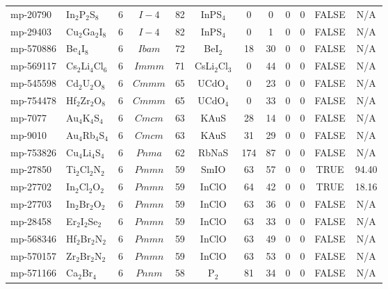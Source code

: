 {\begin{longtable}{llcccccccccc}
    mp-20790 & In$_{2}$P$_{2}$S$_{8}$ & 6     & $I-4$ & 82    & InPS$_{4}$ & 0     & 0     & 0     & 0     & FALSE & N/A \\
    mp-29403 & Cu$_{2}$Ga$_{2}$I$_{8}$ & 6     & $I-4$ & 82    & InPS$_{4}$ & 0     & 1     & 0     & 0     & FALSE & N/A \\
    mp-570886 & Be$_{4}$I$_{8}$ & 6     & $Ibam$ & 72    & BeI$_{2}$ & 18    & 30    & 0     & 0     & FALSE & N/A \\
    mp-569117 & Cs$_{2}$Li$_{4}$Cl$_{6}$ & 6     & $Immm$ & 71    & CsLi$_{2}$Cl$_{3}$ & 0     & 44    & 0     & 0     & FALSE & N/A \\
    mp-545598 & Cd$_{2}$U$_{2}$O$_{8}$ & 6     & $Cmmm$ & 65    & UCdO$_{4}$ & 0     & 23    & 0     & 0     & FALSE & N/A \\
    mp-754478 & Hf$_{2}$Zr$_{2}$O$_{8}$ & 6     & $Cmmm$ & 65    & UCdO$_{4}$ & 0     & 33    & 0     & 0     & FALSE & N/A \\
    mp-7077 & Au$_{4}$K$_{4}$S$_{4}$ & 6     & $Cmcm$ & 63    & KAuS  & 28    & 14    & 0     & 0     & FALSE & N/A \\
    mp-9010 & Au$_{4}$Rb$_{4}$S$_{4}$ & 6     & $Cmcm$ & 63    & KAuS  & 31    & 29    & 0     & 0     & FALSE & N/A \\
    mp-753826 & Cu$_{4}$Li$_{4}$S$_{4}$ & 6     & $Pnma$ & 62    & RbNaS & 174   & 87    & 0     & 0     & FALSE & N/A \\
    mp-27850 & Ti$_{2}$Cl$_{2}$N$_{2}$ & 6     & $Pmmn$ & 59    & SmIO  & 63    & 57    & 0     & 0     & TRUE  & 94.40  \\
    mp-27702 & In$_{2}$Cl$_{2}$O$_{2}$ & 6     & $Pmmn$ & 59    & InClO & 64    & 42    & 0     & 0     & TRUE  & 18.16  \\
    mp-27703 & In$_{2}$Br$_{2}$O$_{2}$ & 6     & $Pmmn$ & 59    & InClO & 63    & 36    & 0     & 0     & FALSE & N/A \\
    mp-28458 & Er$_{2}$I$_{2}$Se$_{2}$ & 6     & $Pmmn$ & 59    & InClO & 63    & 33    & 0     & 0     & FALSE & N/A \\
    mp-568346 & Hf$_{2}$Br$_{2}$N$_{2}$ & 6     & $Pmmn$ & 59    & InClO & 63    & 49    & 0     & 0     & FALSE & N/A \\
    mp-570157 & Zr$_{2}$Br$_{2}$N$_{2}$ & 6     & $Pmmn$ & 59    & InClO & 63    & 53    & 0     & 0     & FALSE & N/A \\
    mp-571166 & Ca$_{2}$Br$_{4}$ & 6     & $Pnnm$ & 58    & P$_{2}$ & 81    & 34    & 0     & 0     & FALSE & N/A \\

\end{longtable}}
